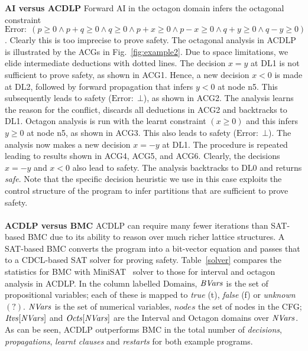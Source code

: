 \noindent \textbf{AI versus ACDLP}
Forward AI in the octagon domain infers 
the octagonal constraint $\mathrm{Error}{:}\;(p\geq0 \wedge p+q\geq0 \wedge q\geq0 \wedge p+x\geq0 \wedge 
p-x\geq0 \wedge q+y\geq0 \wedge q-y\geq0)$. Clearly this is too 
imprecise to prove safety. 
%
The octagonal analysis in ACDLP is illustrated by the ACGs in
Fig.~\ref{fig:example2}.  Due to space limitations, we elide intermediate
deductions with dotted lines.  The decision $x=y$ at DL1 is not sufficient
to prove safety, as shown in ACG1.  Hence, a new decision $x<0$ is made at
DL2, followed by forward propagation that infers $y<0$ at node n5.  This
subsequently leads to safety ($\mathrm{Error}{:}\;\bot$), as shown in ACG2. 
The analysis learns the reason for the conflict, discards all deductions in
ACG2 and backtracks to DL1.  Octagon analysis is run with the learnt
constraint $(x\geq0)$ and this infers $y\geq0$ at node n5, as shown in ACG3. 
This also leads to safety ($\mathrm{Error}{:}\;\bot$).  The analysis now
makes a new decision $x=-y$ at DL1.  The procedure is repeated leading to
results shown in ACG4, ACG5, and ACG6.  Clearly, the decisions $x=-y$ and
$x<0$ also lead to safety.  The analysis backtracks to DL0 and returns {\em
safe}.  Note that the specific decision heuristic we use in this case
exploits the control structure of the program to infer partitions that are
sufficient to prove safety. \\ \\
%
\noindent \textbf{ACDLP versus BMC}
ACDLP can require many fewer iterations than SAT-based BMC due to its
ability to reason over much richer lattice structures.
A SAT-based BMC converts the program into a bit-vector equation 
and passes that to a CDCL-based SAT solver for proving safety.  
Table~\ref{solver} compares the statistics for BMC with 
MiniSAT~\cite{minisat} solver to those for interval and octagon 
analysis in ACDLP. In the column labelled $\textrm{Domains}$, 
$\mathit{BVars}$ is the set of propositional variables; each of these is mapped to
{\em true} (t), {\em false} (f) or {\em unknown} $(?)$. $\mathit{NVars}$ is the set of
numerical variables, $\mathit{nodes}$ the set of nodes in the CFG;
$\mathit{Itvs}[\mathit{NVars}]$ and $\mathit{Octs}[\mathit{NVars}]$ are the Interval and Octagon
domains over $\mathit{NVars}$. As can be seen, ACDLP outperforms BMC in the total number of 
{\em decisions}, {\em propagations}, {\em learnt clauses} and {\em restarts} 
for both example programs.

